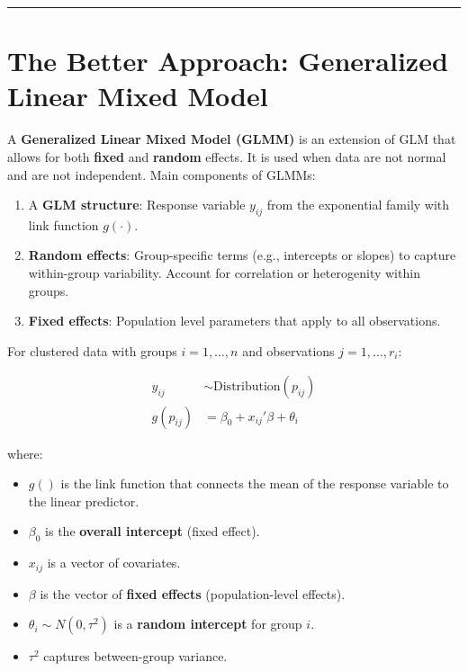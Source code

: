 \documentclass[
  letterpaper,
  DIV=11,
  numbers=noendperiod]{scrreprt}
\providecommand{\tightlist}{%
  \setlength{\itemsep}{0pt}\setlength{\parskip}{0pt}}\usepackage{longtable,booktabs,array}
\begin{document}
\begin{center}\rule{0.5\linewidth}{0.5pt}\end{center}

\hypertarget{the-better-approach-generalized-linear-mixed-model}{%
\section*{\texorpdfstring{\textbf{The Better Approach: Generalized
Linear Mixed
Model}}{The Better Approach: Generalized Linear Mixed Model}}\label{the-better-approach-generalized-linear-mixed-model}}


A \textbf{Generalized Linear Mixed Model (GLMM)} is an extension of GLM
that allows for both \textbf{fixed} and \textbf{random} effects. It is
used when data are not normal and are not independent. Main components
of GLMMs:

\begin{enumerate}
\def\labelenumi{\arabic{enumi}.}
\tightlist
\item
  A \textbf{GLM structure}: Response variable \(y_{ij}\) from the
  exponential family with link function \(g(\cdot)\).
\item
  \textbf{Random effects}: Group-specific terms (e.g., intercepts or
  slopes) to capture within-group variability. Account for correlation
  or heterogenity within groups.
\item
  \textbf{Fixed effects}: Population level parameters that apply to all
  observations.
\end{enumerate}

For clustered data with groups \(i = 1, \dots, n\) and observations
\(j = 1, \dots, r_i\):

\[
\begin{align*}
y_{ij} &\sim \text{Distribution}(p_{ij}) \\
g(p_{ij})&= \beta_0 + x_{ij}' \beta + \theta_i
\end{align*}
\]

where:

\begin{itemize}
\tightlist
\item
  \(g()\) is the link function that connects the mean of the response
  variable to the linear predictor.
\item
  \(\beta_0\) is the \textbf{overall intercept} (fixed effect).
\item
  \(x_{ij}\) is a vector of covariates.
\item
  \(\beta\) is the vector of \textbf{fixed effects} (population-level
  effects).
\item
  \(\theta_i \sim N(0, \tau^2)\) is a \textbf{random intercept} for
  group \(i\).
\item
  \(\tau^2\) captures between-group variance.
\end{itemize}
\end{document}

